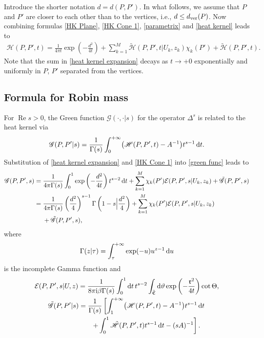 \documentclass[pdftex]{sigma}
\numberwithin{equation}{section}
\theoremstyle{definition}
\begin{document}
Introduce the shorter notation $d=d(P,P')$. In what follows, we assume that $P$ and $P'$ are closer to each other than to the vertices, i.e., $d\le d_{\rm ver}(P)$. Now combining formulas \eqref{HK Plane}, \eqref{HK Cone 1}, \eqref{parametrix} and \eqref{heat kernel} leads to
\begin{equation}
\label{heat kernel expansion}
\begin{split}
\mathscr{H}(P,P',t)=\frac{1}{4\pi t}\exp\left(-\frac{d^2}{4t}\right)+\sum_{k=1}^M\tilde{\mathcal{H}}(P,P',t|U_k,z_k)\chi_k(P')+\tilde{\mathscr{H}}(P,P',t).
\end{split}
\end{equation}
Note that the sum in \eqref{heat kernel expansion} decays as $t\to +0$ exponentially and uniformly in $P$, $P'$ separated from the vertices.

\subsection{Formula for Robin mass}
For $\operatorname{Re} s>0$, the Green function $\mathscr{G}(\cdot,\cdot|s)$ for the operator $\Delta^{s}$ is related to the heat kernel via
\begin{equation}
\label{green func}
\mathscr{G}(P,P'|s)=\frac{1}{\Gamma(s)}\int_{0}^{+\infty}\bigl(\mathscr{H}(P,P',t)-A^{-1}\bigr)t^{s-1}\,{\rm d}t.
\end{equation}
Substitution of \eqref{heat kernel expansion} and \eqref{HK Cone 1} into \eqref{green func} leads to
\begin{align}
\mathscr{G}(P,P',s)={}&\frac{1}{4\pi\Gamma(s)}\int_{0}^{1}\exp\left(-\frac{d^2}{4t}\right)t^{s-2}\, {\rm d}t +\sum_{k=1}^M\chi_k(P')\mathcal{E}(P,P',s|U_k,z_k)
+\tilde{\mathscr{G}}(P,P',s)\nonumber\\
={}&\frac{1}{4\pi\Gamma(s)}\left(\frac{d^2}{4}\right)^{s-1}\Gamma\left(1-s\Big|\frac{d^2}{4}\right)+\sum_{k=1}^M\chi_k(P')\mathcal{E}(P,P',s|U_k,z_k)\nonumber\\
&
+\tilde{\mathscr{G}}(P,P',s),\label{Green exp}
\end{align}
where
\[\Gamma(z|\tau)=\int_{\tau}^{+\infty}\exp(-u)u^{z-1}\, {\rm d}u\]
is the incomplete Gamma function and
\begin{gather}
\mathcal{E}(P,P',s|U,z)=\frac{1}{8\pi {\rm i} \beta\Gamma(s)}\int_{0}^{1} {\rm d}t\, t^{s-2}\int_{\tilde{\mathfrak{C}}}{\rm d}\vartheta \exp\left(-\frac{\mathfrak{r}^2}{4t}\right)\operatorname{cot}\Theta,\label{molel tilde green}
\\
\tilde{\mathscr{G}}(P,P'|s)=\frac{1}{\Gamma(s)}\left[\int_{1}^{+\infty}\bigl(\mathscr{H}(P,P',t)-A^{-1}\bigr)t^{s-1}\, {\rm d}t\right.\nonumber\\
\phantom{\tilde{\mathscr{G}}(P,P'|s)=}{}\left.+\int_{0}^{1}\tilde{\mathscr{H}}(P,P',t)t^{s-1}\, {\rm d}t-(sA)^{-1}\right].\label{tilde green}
\end{gather}
\end{document}
